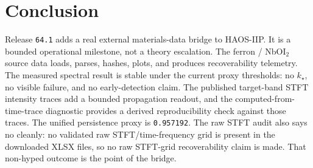 \documentclass[11pt]{article}
\begin{document}
\section{Conclusion}

Release \texttt{64.1} adds a real external materials-data bridge to HAOS-IIP. It is a bounded operational milestone, not a theory escalation. The ferron / NbOI$_2$ source data loads, parses, hashes, plots, and produces recoverability telemetry. The measured spectral result is stable under the current proxy thresholds: no \(k_\star\), no visible failure, and no early-detection claim. The published target-band STFT intensity traces add a bounded propagation readout, and the computed-from-time-trace diagnostic provides a derived reproducibility check against those traces. The unified persistence proxy is \texttt{0.957192}. The raw STFT audit also says no cleanly: no validated raw STFT/time-frequency grid is present in the downloaded XLSX files, so no raw STFT-grid recoverability claim is made. That non-hyped outcome is the point of the bridge.
\end{document}
